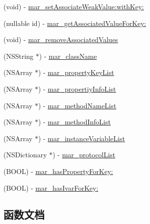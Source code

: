 \begin{DoxyCompactItemize}
(void) -\/ \hyperlink{category_n_s_object_07_m_a_r_e_x___r_u_n_t_i_m_e_08_a734fd63edf50fcc5b67cf4cff1abdac9}{mar\+\_\+set\+Associate\+Weak\+Value\+:with\+Key\+:}
\item 
(nullable id) -\/ \hyperlink{category_n_s_object_07_m_a_r_e_x___r_u_n_t_i_m_e_08_ae9eeec53631a5eb529857ecd725fea7c}{mar\+\_\+get\+Associated\+Value\+For\+Key\+:}
\item 
(void) -\/ \hyperlink{category_n_s_object_07_m_a_r_e_x___r_u_n_t_i_m_e_08_a986741889cdf008bda99bb10df1564b4}{mar\+\_\+remove\+Associated\+Values}
\item 
(N\+S\+String $\ast$) -\/ \hyperlink{category_n_s_object_07_m_a_r_e_x___r_u_n_t_i_m_e_08_a3058226e5449755cc7d226b7951dba25}{mar\+\_\+class\+Name}
\item 
(N\+S\+Array $\ast$) -\/ \hyperlink{category_n_s_object_07_m_a_r_e_x___r_u_n_t_i_m_e_08_a612b9bf6d1fd93ed4fe8198d34e884d3}{mar\+\_\+property\+Key\+List}
\item 
(N\+S\+Array $\ast$) -\/ \hyperlink{category_n_s_object_07_m_a_r_e_x___r_u_n_t_i_m_e_08_a3cb8fb46872bb4d061f288e1e57cd3bf}{mar\+\_\+propertiy\+Info\+List}
\item 
(N\+S\+Array $\ast$) -\/ \hyperlink{category_n_s_object_07_m_a_r_e_x___r_u_n_t_i_m_e_08_aaff070293035f7d9f08ac2d8f308ba2e}{mar\+\_\+method\+Name\+List}
\item 
(N\+S\+Array $\ast$) -\/ \hyperlink{category_n_s_object_07_m_a_r_e_x___r_u_n_t_i_m_e_08_a3a8102e3d25daca038e9cf0b19b5e5c9}{mar\+\_\+method\+Info\+List}
\item 
(N\+S\+Array $\ast$) -\/ \hyperlink{category_n_s_object_07_m_a_r_e_x___r_u_n_t_i_m_e_08_a02960ffd381bbfc1fdd0f63c8fe75cfb}{mar\+\_\+instance\+Variable\+List}
\item 
(N\+S\+Dictionary $\ast$) -\/ \hyperlink{category_n_s_object_07_m_a_r_e_x___r_u_n_t_i_m_e_08_a17909e9ae80ee3a66778e8aeeaccec75}{mar\+\_\+protocol\+List}
\item 
(B\+O\+OL) -\/ \hyperlink{category_n_s_object_07_m_a_r_e_x___r_u_n_t_i_m_e_08_ae62fe0aa26dfd39d671f119a7a6594d9}{mar\+\_\+has\+Property\+For\+Key\+:}
\item 
(B\+O\+OL) -\/ \hyperlink{category_n_s_object_07_m_a_r_e_x___r_u_n_t_i_m_e_08_a92cd786e4ff67ef7b1921bbc7cfe7e30}{mar\+\_\+has\+Ivar\+For\+Key\+:}
\end{DoxyCompactItemize}


\subsection{函数文档}
\mbox{\label{category_n_s_object_07_m_a_r_e_x___r_u_n_t_i_m_e_08_a3058226e5449755cc7d226b7951dba25}} 
